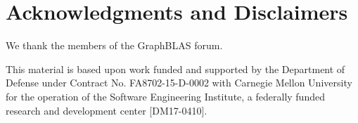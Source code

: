 %
%

\section*{Acknowledgments and Disclaimers}

We thank the members of the GraphBLAS forum.

This material is based upon work funded and supported by the Department of 
Defense under Contract No. FA8702-15-D-0002 with Carnegie Mellon University for 
the operation of the Software Engineering Institute, a federally funded research 
and development center [DM17-0410].

